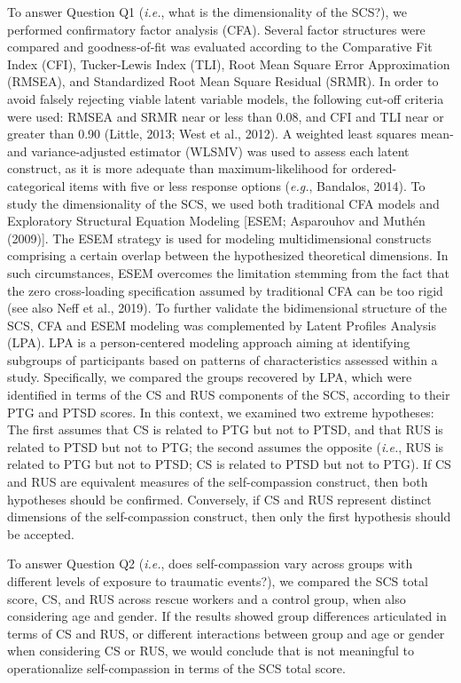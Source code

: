 \documentclass[
  english,
  man,floatsintext]{apa7}
\begin{document}
To answer Question Q1 (\emph{i.e.}, what is the dimensionality of the SCS?), we performed confirmatory factor analysis (CFA). Several factor structures were compared and goodness‐of‐fit was evaluated according to the Comparative Fit Index (CFI), Tucker-Lewis Index (TLI), Root Mean Square Error Approximation (RMSEA), and Standardized Root Mean Square Residual (SRMR). In order to avoid falsely rejecting viable latent variable models, the following cut-off criteria were used: RMSEA and SRMR near or less than 0.08, and CFI and TLI near or greater than 0.90 (Little, 2013; West et al., 2012). A weighted least squares mean- and variance-adjusted estimator (WLSMV) was used to assess each latent construct, as it is more adequate than maximum-likelihood for ordered-categorical items with five or less response options (\emph{e.g.}, Bandalos, 2014). To study the dimensionality of the SCS, we used both traditional CFA models and Exploratory Structural Equation Modeling {[}ESEM; Asparouhov and Muthén (2009){]}. The ESEM strategy is used for modeling multidimensional constructs comprising a certain overlap between the hypothesized theoretical dimensions. In such circumstances, ESEM overcomes the limitation stemming from the fact that the zero cross-loading specification assumed by traditional CFA can be too rigid (see also Neff et al., 2019). To further validate the bidimensional structure of the SCS, CFA and ESEM modeling was complemented by Latent Profiles Analysis (LPA). LPA is a person-centered modeling approach aiming at identifying subgroups of participants based on patterns of characteristics assessed within a study. Specifically, we compared the groups recovered by LPA, which were identified in terms of the CS and RUS components of the SCS, according to their PTG and PTSD scores. In this context, we examined two extreme hypotheses: The first assumes that CS is related to PTG but not to PTSD, and that RUS is related to PTSD but not to PTG; the second assumes the opposite (\emph{i.e.}, RUS is related to PTG but not to PTSD; CS is related to PTSD but not to PTG). If CS and RUS are equivalent measures of the self-compassion construct, then both hypotheses should be confirmed. Conversely, if CS and RUS represent distinct dimensions of the self-compassion construct, then only the first hypothesis should be accepted.

To answer Question Q2 (\emph{i.e.}, does self-compassion vary across groups with different levels of exposure to traumatic events?), we compared the SCS total score, CS, and RUS across rescue workers and a control group, when also considering age and gender. If the results showed group differences articulated in terms of CS and RUS, or different interactions between group and age or gender when considering CS or RUS, we would conclude that is not meaningful to operationalize self-compassion in terms of the SCS total score.
\end{document}
